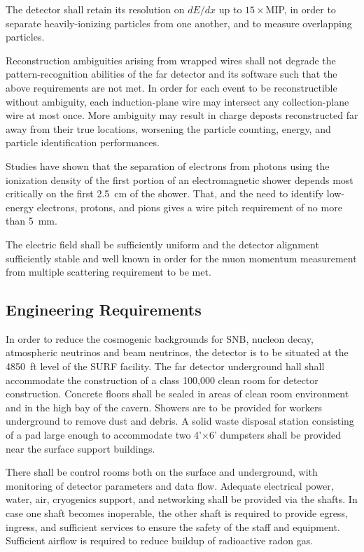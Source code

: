 The detector shall retain its resolution on $dE/dx$ up to $15\times
$MIP, in order to separate heavily-ionizing particles from one
another, and to measure overlapping particles.

Reconstruction ambiguities arising from wrapped wires shall not
degrade the pattern-recognition abilities of the far detector and its
software such that the above requirements are not met.  In order for
each event to be reconstructible without ambiguity, each
induction-plane wire may intersect any collection-plane wire at most
once.  More ambiguity may result in charge deposts reconstructed far
away from their true locations, worsening the particle counting,
energy, and particle identification performances.

Studies have shown that the separation of electrons from photons
using the ionization density of the first portion of an electromagnetic shower
depends most critically on the first 2.5~cm of the shower.  That, and the need
to identify low-energy electrons, protons, and pions gives a wire pitch
requirement of no more than 5~mm.

The electric field shall be sufficiently uniform and the detector alignment
sufficiently stable and well known in order for the muon momentum measurement
from multiple scattering requirement to be met.

\subsection{Engineering Requirements}

In order to reduce the cosmogenic backgrounds for SNB, nucleon decay,
atmospheric neutrinos and beam neutrinos, the detector is to be situated
at the 4850~ft level of the SURF facility.  The far detector underground hall shall
accommodate the construction of a class 100,000 clean room for detector
construction.  Concrete floors shall be sealed in areas of clean room environment
and in the high bay of the cavern.  Showers are to be provided for workers underground
to remove dust and debris.  A solid waste disposal station consisting of a pad
large enough to accommodate two 4'$\times$6' dumpsters shall be provided near
the surface support buildings.

There shall be control rooms both on the surface and underground, with monitoring
of detector parameters and data flow.  Adequate electrical power, water, air,
cryogenics support, and networking shall be provided via the shafts.   In case
one shaft becomes inoperable, the other shaft is required to provide egress, ingress,
and sufficient services to ensure the safety of the staff and equipment.
Sufficient airflow is required to reduce buildup of radioactive radon gas.

